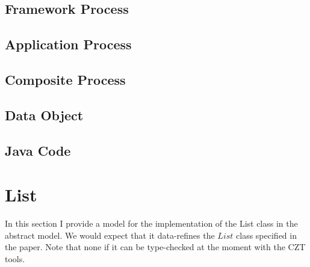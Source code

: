 \documentclass{article}
\begin{document}
\subsection{Framework Process}

\begin{circusbox}

\end{circusbox}

\subsection{Application Process}

\begin{circusbox}

\end{circusbox}

\subsection{Composite Process}

\begin{circusbox}

\end{circusbox}

\subsection{Data Object}

\begin{circusbox}

\end{circusbox}

\newpage

\subsection{Java Code}


\newpage


\section{List}

In this section I provide a model for the implementation of the List class in the abstract model. We would expect that it data-refines the $List$ class specified in the paper. Note that none if it can be type-checked at the moment with the CZT {\Circus} tools.
\end{document}
